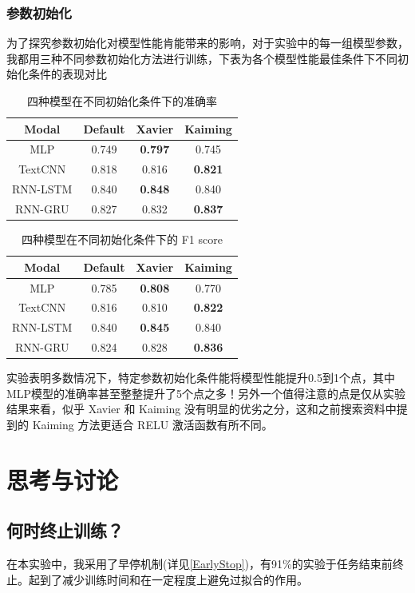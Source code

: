 \documentclass{article}
\begin{document}
\begin{spacing}{1.1}
	\subsubsection{参数初始化}\label{ini}
		\hspace{1.4em}
		为了探究参数初始化对模型性能肯能带来的影响，对于实验中的每一组模型参数，我都用三种不同参数初始化方法进行训练，下表为各个模型性能最佳条件下不同初始化条件的表现对比
		\begin{table}[h]
			\center
			\begin{tabular}{c|ccc}
				\textbf{Modal} & \textbf{Default} & \textbf{Xavier} & \textbf{Kaiming} \\
				\hline
				MLP & 0.749 & \textbf{0.797} & 0.745 \\
				\hline
				TextCNN & 0.818 & 0.816 & \textbf{0.821}\\
				\hline
				RNN-LSTM & 0.840 & \textbf{0.848} & 0.840 \\
				\hline
				RNN-GRU & 0.827 & 0.832 & \textbf{0.837} \\
			\end{tabular}
			\caption{四种模型在不同初始化条件下的准确率}
		\end{table}
		\begin{table}[h]
			\center
			\begin{tabular}{c|ccc}
				\textbf{Modal} & \textbf{Default} & \textbf{Xavier} & \textbf{Kaiming} \\
				\hline
				MLP & 0.785 & \textbf{0.808} & 0.770 \\
				\hline
				TextCNN & 0.816 & 0.810 & \textbf{0.822}\\
				\hline
				RNN-LSTM & 0.840 & \textbf{0.845} & 0.840 \\
				\hline
				RNN-GRU & 0.824 & 0.828 & \textbf{0.836} \\
			\end{tabular}
			\caption{四种模型在不同初始化条件下的 F1 score}
		\end{table}
		实验表明多数情况下，特定参数初始化条件能将模型性能提升0.5到1个点，其中MLP模型的准确率甚至整整提升了5个点之多！另外一个值得注意的点是仅从实验结果来看，似乎 Xavier 和 Kaiming 没有明显的优劣之分，这和之前搜索资料中提到的 Kaiming 方法更适合 RELU 激活函数有所不同。 
\section{思考与讨论}
\subsection{何时终止训练？}
	\hspace{1.4em}
	在本实验中，我采用了早停机制(详见\ref{EarlyStop})，有91\%的实验于任务结束前终止。起到了减少训练时间和在一定程度上避免过拟合的作用。
	

\end{spacing}
\end{document}
